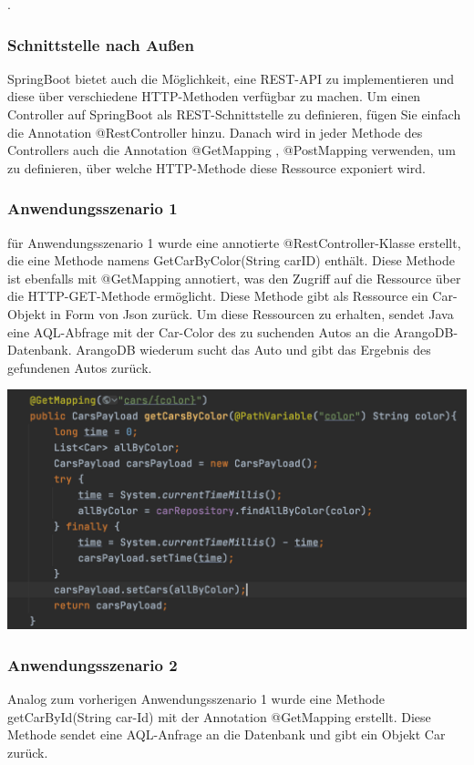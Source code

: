 .\subsubsection{Schnittstelle nach Außen}
SpringBoot bietet auch die Möglichkeit, eine REST-API zu implementieren und diese über verschiedene HTTP-Methoden verfügbar zu machen. Um einen Controller auf SpringBoot als REST-Schnittstelle zu definieren, fügen Sie einfach die Annotation @RestController hinzu. Danach wird  in jeder Methode des Controllers auch die Annotation @GetMapping , @PostMapping verwenden, um zu definieren, über welche HTTP-Methode diese Ressource exponiert wird.
\subsubsection{Anwendungsszenario 1}

für Anwendungsszenario 1 wurde eine annotierte @RestController-Klasse erstellt, die eine Methode namens GetCarByColor(String carID) enthält. Diese Methode ist ebenfalls mit @GetMapping annotiert, was den Zugriff auf die Ressource über die HTTP-GET-Methode ermöglicht. Diese Methode gibt als Ressource ein Car-Objekt in Form von Json zurück. Um diese Ressourcen zu erhalten, sendet Java eine AQL-Abfrage mit der Car-Color des zu suchenden Autos an die ArangoDB-Datenbank. ArangoDB wiederum sucht das Auto und gibt das Ergebnis des gefundenen Autos zurück. 

\begin{center}
\includegraphics[scale=.4]{images/carByColor}
\end{center}

\subsubsection{Anwendungsszenario 2}
Analog zum vorherigen Anwendungsszenario 1 wurde eine Methode getCarById(String car-Id) mit der Annotation @GetMapping erstellt. Diese Methode sendet eine AQL-Anfrage an die Datenbank und gibt ein Objekt Car zurück.

